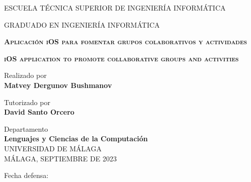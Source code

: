 \begin{titlepage}
    \selectfont
    
    \begin{center}
        {\large ESCUELA TÉCNICA SUPERIOR DE INGENIERÍA INFORMÁTICA}

        \vspace{0.1cm}
        {\large GRADUADO EN INGENIERÍA INFORMÁTICA}

        \vspace{2cm}
        \Large
        \textbf{\textsc{Aplicación iOS para fomentar grupos colaborativos y actividades}}
        \vspace{1cm}
        
        \Large
        \textbf{\textsc{iOS application to promote collaborative groups and activities}}

        \vspace{2cm}
        \large
        Realizado por\\
        \textbf{Matvey Dergunov Bushmanov}

        \vspace{1cm}
        \large
        Tutorizado por\\
        \textbf{David Santo Orcero}

        \vspace{1cm}
        \large
        Departamento\\
        \textbf{Lenguajes y Ciencias de la Computación}\\

        \vspace{2cm}
        \large
        UNIVERSIDAD DE MÁLAGA
        \\
        MÁLAGA, SEPTIEMBRE DE 2023
    \end{center}
    \begin{flushright}
        \vspace{1.5cm}
        Fecha defensa: 
    \end{flushright}
\end{titlepage}

\begingroup
    \pagestyle{empty}
    \cleardoublepage
\endgroup
